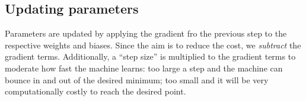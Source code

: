 \hypertarget{updating-parameters}{%
\subsection{Updating parameters}\label{updating-parameters}}

Parameters are updated by applying the gradient fro the previous step to
the respective weights and biases. Since the aim is to reduce the cost,
we \emph{subtract} the gradient terms. Additionally, a ``step size'' is
multiplied to the gradient terms to moderate how fast the machine
learns: too large a step and the machine can bounce in and out of the
desired minimum; too small and it will be very computationally costly to
reach the desired point.

\begin{Shaded}
\begin{Highlighting}[]
\OtherTok{\textless{}{-}} 
  
\OtherTok{\textless{}{-}}\NormalTok{ params[[}\NormalTok{]]}
\OtherTok{\textless{}{-}}\NormalTok{ params[[}\NormalTok{]]}
\OtherTok{\textless{}{-}}\NormalTok{ params[[}\NormalTok{]]}
\OtherTok{\textless{}{-}}\NormalTok{ params[[}\NormalTok{]]}
  
\OtherTok{\textless{}{-}}\NormalTok{ gradient[[}\NormalTok{]]}
\OtherTok{\textless{}{-}}\NormalTok{ gradient[[}\NormalTok{]]}
\OtherTok{\textless{}{-}}\NormalTok{ gradient[[}\NormalTok{]]}
\OtherTok{\textless{}{-}}\NormalTok{ gradient[[}\NormalTok{]]}
  
\OtherTok{\textless{}{-}}\SpecialCharTok{{-}}\SpecialCharTok{*}
\OtherTok{\textless{}{-}}\SpecialCharTok{{-}}\SpecialCharTok{*}
\OtherTok{\textless{}{-}}\SpecialCharTok{{-}}\SpecialCharTok{*}
\OtherTok{\textless{}{-}}\SpecialCharTok{{-}}\SpecialCharTok{*}
  
\OtherTok{\textless{}{-}} \NormalTok{(} \OtherTok{=}
                          \OtherTok{=}
                          \OtherTok{=}
                          \OtherTok{=}
  
\NormalTok{\}}

\OtherTok{\textless{}{-}}  \NormalTok{)}
\end{Highlighting}
\end{Shaded}

